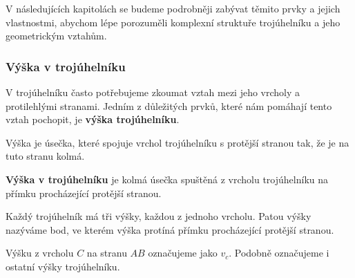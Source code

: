 \documentclass[12pt,a4paper]{article}
\begin{document}
V následujících kapitolách se budeme podrobněji zabývat těmito prvky a jejich vlastnostmi,
abychom lépe porozuměli komplexní struktuře trojúhelníku a jeho geometrickým vztahům.


\subsubsection*{Výška v trojúhelníku}
V trojúhelníku často potřebujeme zkoumat vztah mezi jeho vrcholy a protilehlými stranami.
Jedním z důležitých prvků, které nám pomáhají tento vztah pochopit, je \textbf{výška trojúhelníku}.

Výška je úsečka, které spojuje vrchol trojúhelníku s protější stranou tak, že je na tuto stranu kolmá.

\begin{definitionbox}
    \textbf{Výška v trojúhelníku} je kolmá úsečka spuštěná z vrcholu trojúhelníku na přímku procházející protější stranou.
\end{definitionbox}

Každý trojúhelník má tři výšky, každou z jednoho vrcholu. Patou výšky nazýváme bod, ve kterém výška protíná přímku procházející protější stranou.

\begin{center}
\end{center}

Výšku z vrcholu $C$ na stranu $AB$ označujeme jako $v_c$. Podobně označujeme i ostatní výšky trojúhelníku.
\end{document}
